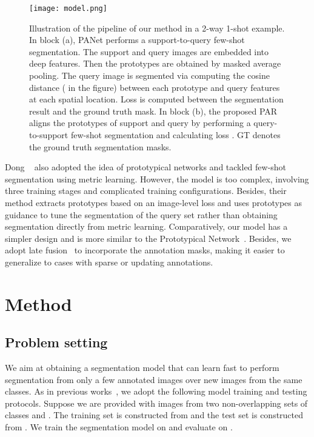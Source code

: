 \documentclass[10pt,twocolumn,letterpaper]{article}
\begin{document}
\begin{figure*}[t!]
\begin{center}
   \texttt{[image: model.png]}
\end{center}
   \caption{Illustration of the pipeline of our method in a 2-way 1-shot example. In block (a), PANet performs a support-to-query few-shot segmentation. The support and query images are embedded into deep features. Then the prototypes are obtained by masked average pooling. The query image is segmented via computing the cosine distance ( in the figure) between each prototype and query features at each spatial location. Loss  is computed between the segmentation result and the ground truth mask. In block (b), the proposed PAR aligns the prototypes of support and query by performing a query-to-support few-shot segmentation and calculating loss . GT denotes the ground truth segmentation masks.}
\label{fig:model}
\end{figure*}

Dong \etal~\cite{dong2018few} also adopted the idea of prototypical networks and tackled few-shot segmentation using metric learning. However, the model is too complex, involving three training stages and complicated training configurations. Besides, their method extracts prototypes based on an image-level loss and uses prototypes as guidance to tune the segmentation of the query set rather than obtaining segmentation directly from metric learning. Comparatively, our model has a simpler design and is more similar to the Prototypical Network~\cite{snell2017prototypical}. Besides, we adopt late fusion~\cite{rakelly2018few} to incorporate the annotation masks, making it easier to generalize to cases with sparse or updating annotations.






\section{Method}

\subsection{Problem setting}
We aim at obtaining a segmentation model that can learn fast to perform segmentation from only a few annotated images over new images from the same classes. As in previous works~\cite{shaban2017one},
we adopt the following model training and testing protocols. Suppose we are provided with images from two non-overlapping sets of classes  and . The training set  is constructed from  and the test set  is constructed from . We train the segmentation model   on  and evaluate on . 
 
\end{document}
